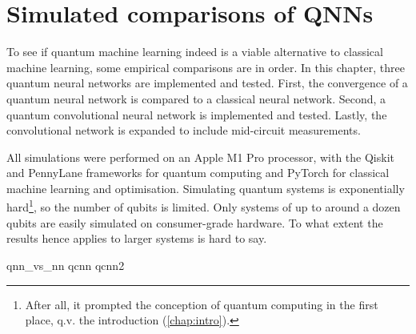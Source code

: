 \chapter{Simulated comparisons of QNNs}
\label{chap:comparison}

To see if quantum machine learning indeed is a viable alternative to classical machine learning, some empirical comparisons are in order.
In this chapter, three quantum neural networks are implemented and tested.
First, the convergence of a quantum neural network is compared to a classical neural network.
Second, a quantum convolutional neural network is implemented and tested.
Lastly, the convolutional network is expanded to include mid-circuit measurements.

All simulations were performed on an Apple M1 Pro processor, with the Qiskit \cite{qiskit} and PennyLane \cite{pennylane} frameworks for quantum computing and PyTorch \cite{pytorch} for classical machine learning and optimisation.
Simulating quantum systems is exponentially hard\footnote{After all, it prompted the conception of quantum computing in the first place, q.v. the introduction (\cref{chap:intro}).}, so the number of qubits is limited.
Only systems of up to around a dozen qubits are easily simulated on consumer-grade hardware.
To what extent the results hence applies to larger systems is hard to say.

{qnn_vs_nn}
{qcnn}
{qcnn2}